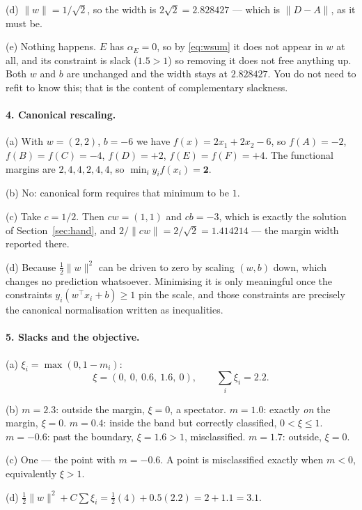 \documentclass[11pt]{article}
\begin{document}
(d) $\|w\| = 1/\sqrt2$, so the width is $2\sqrt2 = \mathbf{2.828427}$ --- which
is $\|D - A\|$, as it must be.

(e) Nothing happens. $E$ has $\alpha_E = 0$, so by \eqref{eq:wsum} it does not
appear in $w$ at all, and its constraint is slack ($1.5 > 1$) so removing it
does not free anything up. Both $w$ and $b$ are unchanged and the width stays
at $2.828427$. You do not need to refit to know this; that is the content of
complementary slackness.

\paragraph{4. Canonical rescaling.}
(a) With $w = (2,2)$, $b = -6$ we have $f(x) = 2x_1 + 2x_2 - 6$, so
$f(A) = -2$, $f(B) = f(C) = -4$, $f(D) = +2$, $f(E) = f(F) = +4$. The
functional margins are $2, 4, 4, 2, 4, 4$, so
$\min_i y_i f(x_i) = \mathbf{2}$.

(b) No: canonical form requires that minimum to be $1$.

(c) Take $c = 1/2$. Then $cw = (1,1)$ and $cb = -3$, which is exactly the
solution of Section~\ref{sec:hand}, and
$2/\|cw\| = 2/\sqrt2 = 1.414214$ --- the margin width reported there.

(d) Because $\tfrac12\|w\|^2$ can be driven to zero by scaling $(w,b)$ down,
which changes no prediction whatsoever. Minimising it is only meaningful once
the constraints $y_i(w^\top x_i + b) \ge 1$ pin the scale, and those
constraints are precisely the canonical normalisation written as inequalities.

\paragraph{5. Slacks and the objective.}
(a) $\xi_i = \max(0, 1 - m_i)$:
\[
  \xi = (0,\ 0,\ 0.6,\ 1.6,\ 0),
  \qquad \textstyle\sum_i \xi_i = \mathbf{2.2} .
\]

(b) $m = 2.3$: outside the margin, $\xi = 0$, a spectator. $m = 1.0$: exactly
\emph{on} the margin, $\xi = 0$. $m = 0.4$: inside the band but correctly
classified, $0 < \xi \le 1$. $m = -0.6$: past the boundary,
$\xi = 1.6 > 1$, misclassified. $m = 1.7$: outside, $\xi = 0$.

(c) One --- the point with $m = -0.6$. A point is misclassified exactly when
$m < 0$, equivalently $\xi > 1$.

(d) $\tfrac12\|w\|^2 + C\sum\xi_i
   = \tfrac12(4) + 0.5(2.2) = 2 + 1.1 = \mathbf{3.1}$.
\end{document}
